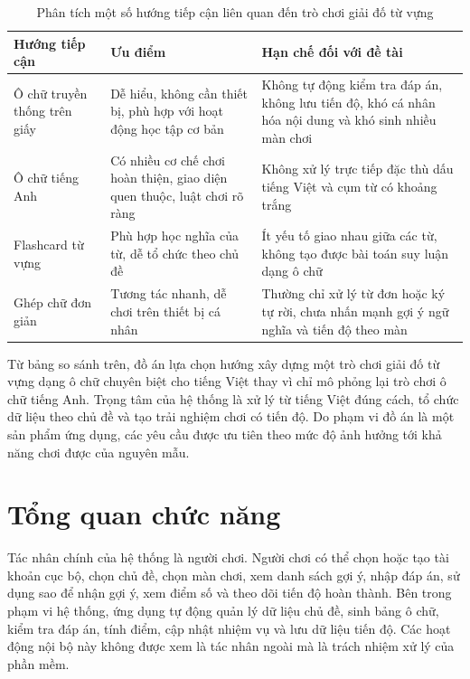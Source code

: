 ﻿\documentclass[../DoAn.tex]{subfiles}
\begin{document}
\begin{table}[H]
\centering
\begin{tabular}{|p{3.2cm}|p{5.2cm}|p{5.2cm}|}
\hline
\textbf{Hướng tiếp cận} & \textbf{Ưu điểm} & \textbf{Hạn chế đối với đề tài} \\ \hline
Ô chữ truyền thống trên giấy & Dễ hiểu, không cần thiết bị, phù hợp với hoạt động học tập cơ bản & Không tự động kiểm tra đáp án, không lưu tiến độ, khó cá nhân hóa nội dung và khó sinh nhiều màn chơi \\ \hline
Ô chữ tiếng Anh & Có nhiều cơ chế chơi hoàn thiện, giao diện quen thuộc, luật chơi rõ ràng & Không xử lý trực tiếp đặc thù dấu tiếng Việt và cụm từ có khoảng trắng \\ \hline
Flashcard từ vựng & Phù hợp học nghĩa của từ, dễ tổ chức theo chủ đề & Ít yếu tố giao nhau giữa các từ, không tạo được bài toán suy luận dạng ô chữ \\ \hline
Ghép chữ đơn giản & Tương tác nhanh, dễ chơi trên thiết bị cá nhân & Thường chỉ xử lý từ đơn hoặc ký tự rời, chưa nhấn mạnh gợi ý ngữ nghĩa và tiến độ theo màn \\ \hline
\end{tabular}
\caption{Phân tích một số hướng tiếp cận liên quan đến trò chơi giải đố từ vựng}
\label{table:related_products}
\end{table}

Từ bảng so sánh trên, đồ án lựa chọn hướng xây dựng một trò chơi giải đố từ vựng dạng ô chữ chuyên biệt cho tiếng Việt thay vì chỉ mô phỏng lại trò chơi ô chữ tiếng Anh. Trọng tâm của hệ thống là xử lý từ tiếng Việt đúng cách, tổ chức dữ liệu theo chủ đề và tạo trải nghiệm chơi có tiến độ. Do phạm vi đồ án là một sản phẩm ứng dụng, các yêu cầu được ưu tiên theo mức độ ảnh hưởng tới khả năng chơi được của nguyên mẫu.

\section{Tổng quan chức năng}
\label{section:2.2}
Tác nhân chính của hệ thống là người chơi. Người chơi có thể chọn hoặc tạo tài khoản cục bộ, chọn chủ đề, chọn màn chơi, xem danh sách gợi ý, nhập đáp án, sử dụng sao để nhận gợi ý, xem điểm số và theo dõi tiến độ hoàn thành. Bên trong phạm vi hệ thống, ứng dụng tự động quản lý dữ liệu chủ đề, sinh bảng ô chữ, kiểm tra đáp án, tính điểm, cập nhật nhiệm vụ và lưu dữ liệu tiến độ. Các hoạt động nội bộ này không được xem là tác nhân ngoài mà là trách nhiệm xử lý của phần mềm.
\end{document}

